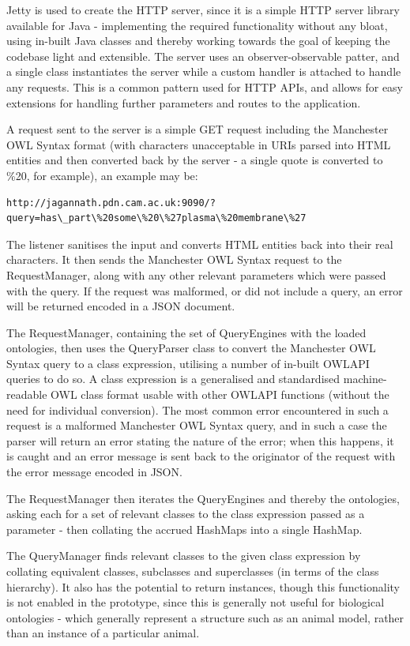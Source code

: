 \documentclass{article}
\begin{document}
Jetty is used to create the HTTP server, since it is a simple HTTP server
library available for Java - implementing the required functionality without any
bloat, using in-built Java classes and thereby working towards the goal of
keeping the codebase light and extensible. The server uses an
observer-observable patter, and a single class instantiates the server while a
custom handler is attached to handle any requests. This is a common pattern used
for HTTP APIs, and allows for easy extensions for handling further parameters
and routes to the application.

A request sent to the server is a simple GET request including the Manchester
OWL Syntax format (with characters unacceptable in URIs parsed into HTML
entities and then converted back by the server - a single quote is converted to
\%20, for example), an example may be:

\begin{lstlisting}
http://jagannath.pdn.cam.ac.uk:9090/?query=has\_part\%20some\%20\%27plasma\%20membrane\%27
\end{lstlisting}

The listener sanitises the input and converts HTML entities back into their real
characters. It then sends the Manchester OWL Syntax request to the
RequestManager, along with any other relevant parameters which were passed with
the query. If the request was malformed, or did not include a query, an error
will be returned encoded in a JSON document. 

The RequestManager, containing the set of QueryEngines with the loaded
ontologies, then uses the QueryParser class to convert the Manchester OWL Syntax 
query to a class expression, utilising a number of in-built OWLAPI queries to do
so. A class expression is a generalised and standardised machine-readable OWL
class format usable with other OWLAPI functions (without the need for individual
conversion). The most common error encountered in such a request is a malformed
Manchester OWL Syntax query, and in such a case the parser will return an error
stating the nature of the error; when this happens, it is caught and an error
message is sent back to the originator of the request with the error message
encoded in JSON.

The RequestManager then iterates the QueryEngines and thereby the
ontologies, asking each for a set of relevant classes to the class expression
passed as a parameter - then collating the accrued HashMaps into a single
HashMap.

The QueryManager finds relevant classes to the given class expression by
collating equivalent classes, subclasses and superclasses (in terms of the class
hierarchy). It also has the potential to return instances, though this
functionality is not enabled in the prototype, since this is generally not
useful for biological ontologies - which generally represent a structure such as
an animal model, rather than an instance of a particular animal.
\end{document}
